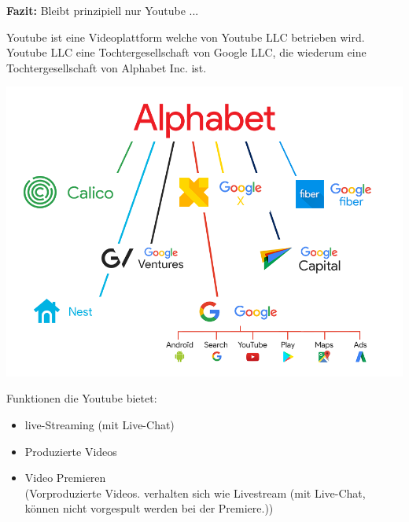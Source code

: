 {\vspace{0,2cm}}
\textbf{Fazit:}
Bleibt prinzipiell nur Youtube ...


Youtube ist eine Videoplattform welche von Youtube LLC betrieben wird. \\
Youtube LLC eine Tochtergesellschaft von Google LLC, die wiederum eine Tochtergesellschaft von Alphabet Inc. ist.

\begin{flushright}
  \includegraphics[scale=1.3]{./pictures/alphabet.png}
\end{flushright}

{\vspace{-2,5cm}}
Funktionen die Youtube bietet:
\begin{itemize}
  \item live-Streaming (mit Live-Chat)
  \item Produzierte Videos
  \item Video Premieren \\ (Vorproduzierte Videos. verhalten sich wie Livestream (mit Live-Chat, können nicht vorgespult werden bei der Premiere.))
\end{itemize}
\newpage

